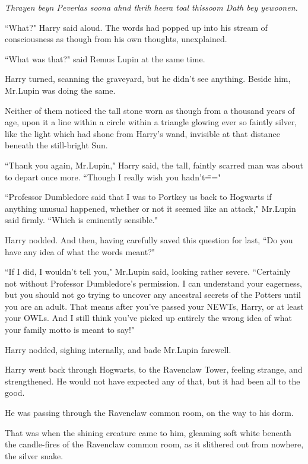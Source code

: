 \emph{Thrayen beyn Peverlas soona ahnd thrih heera toal thissoom Dath bey yewoonen.}

``What?" Harry said aloud. The words had popped up into his stream of consciousness as though from his own thoughts, unexplained.

``What was that?" said Remus Lupin at the same time.

Harry turned, scanning the graveyard, but he didn't see anything. Beside him, Mr.\?Lupin was doing the same.

Neither of them noticed the tall stone worn as though from a thousand years of age, upon it a line within a circle within a triangle glowing ever so faintly silver, like the light which had shone from Harry's wand, invisible at that distance beneath the still-bright Sun.


``Thank you again, Mr.\?Lupin," Harry said, the tall, faintly scarred man was about to depart once more. ``Though I really wish you hadn't\==="

``Professor Dumbledore said that I was to Portkey us back to Hogwarts if anything unusual happened, whether or not it seemed like an attack," Mr.\?Lupin said firmly. ``Which is eminently sensible."

Harry nodded. And then, having carefully saved this question for last, ``Do you have any idea of what the words meant?"

``If I did, I wouldn't tell you," Mr.\?Lupin said, looking rather severe. ``Certainly not without Professor Dumbledore's permission. I can understand your eagerness, but you should not go trying to uncover any ancestral secrets of the Potters until you are an adult. That means after you've passed your NEWTs, Harry, or at least your OWLs. And I still think you've picked up entirely the wrong idea of what your family motto is meant to say!"

Harry nodded, sighing internally, and bade Mr.\?Lupin farewell.

\later

Harry went back through Hogwarts, to the Ravenclaw Tower, feeling strange, and strengthened. He would not have expected any of that, but it had been all to the good.

He was passing through the Ravenclaw common room, on the way to his dorm.

That was when the shining creature came to him, gleaming soft white beneath the candle-fires of the Ravenclaw common room, as it slithered out from nowhere, the silver snake.

